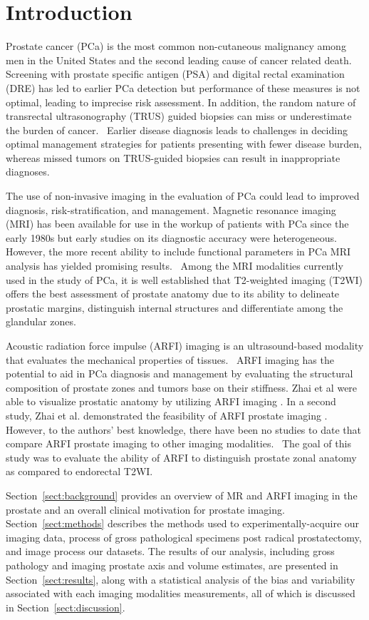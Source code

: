 \section{Introduction}\label{sect:intro}

Prostate cancer (PCa) is the most common non-cutaneous malignancy among men in
the United States and the second leading cause of cancer related
death.~\cite{Howlander2011} Screening with prostate specific antigen (PSA) and
digital rectal examination (DRE) has led to earlier PCa detection but
performance of these measures is not optimal, leading to imprecise risk
assessment.  In addition, the random nature of transrectal ultrasonography
(TRUS) guided biopsies can miss or underestimate the burden of
cancer.~\cite{Gupta2013} Earlier disease diagnosis leads to challenges in
deciding optimal management strategies for patients presenting with fewer
disease burden, whereas missed tumors on TRUS-guided biopsies can result in
inappropriate diagnoses. 

The use of non-invasive imaging in the evaluation of PCa could lead to improved
diagnosis, risk-stratification, and management. Magnetic resonance imaging
(MRI) has been available for use in the workup of patients with PCa since the
early 1980s but early studies on its diagnostic accuracy were heterogeneous.
However, the more recent ability to include functional parameters in PCa MRI
analysis has yielded promising results.~\cite{Gupta2013,Hricak2007} Among the
MRI modalities currently used in the study of PCa, it is well established that
T2-weighted imaging (T2WI) offers the best assessment of prostate anatomy due
to its ability to delineate prostatic margins, distinguish internal structures
and differentiate among the glandular zones. 

Acoustic radiation force impulse (ARFI) imaging is an ultrasound-based modality
that evaluates the mechanical properties of tissues.~\cite{Nightingale2002}
ARFI imaging has the potential to aid in PCa diagnosis and management by
evaluating the structural composition of prostate zones and tumors base on
their stiffness.  Zhai et al were able to visualize prostatic anatomy by
utilizing ARFI imaging \exvivo. In a second study, Zhai et al. demonstrated the
feasibility of ARFI prostate imaging \invivo.~\cite{Zhai2012}  However, to the authors’ best
knowledge, there have been no studies to date that compare \invivo ARFI
prostate imaging to other imaging modalities.~\cite{Zhai2010} The goal of this
study was to evaluate the ability of ARFI to distinguish prostate zonal anatomy
\invivo as compared to endorectal T2WI. 

Section~\ref{sect:background} provides an overview of MR and ARFI imaging in
the prostate and an overall clinical motivation for prostate imaging.
Section~\ref{sect:methods} describes the methods used to experimentally-acquire
our imaging data, process of gross pathological specimens post radical
prostatectomy, and image process our datasets.  The results of our analysis,
including gross pathology and imaging prostate axis and volume estimates, are
presented in Section~\ref{sect:results}, along with a statistical analysis of
the bias and variability associated with each imaging modalities measurements,
all of which is discussed in Section~\ref{sect:discussion}.
